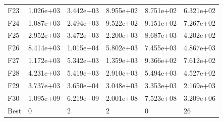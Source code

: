 \begin{tabular}{llllll}
F23  &  1.026e+03 &  3.442e+03 &  8.955e+02 &  8.751e+02 &  6.321e+02 \\
F24  &  1.087e+03 &  2.494e+03 &  9.522e+02 &  9.151e+02 &  7.267e+02 \\
F25  &  2.952e+03 &  3.472e+03 &  2.200e+03 &  8.687e+03 &  4.202e+02 \\
F26  &  8.414e+03 &  1.015e+04 &  5.802e+03 &  7.455e+03 &  4.867e+03 \\
F27  &  1.172e+03 &  5.342e+03 &  1.359e+03 &  9.366e+02 &  7.612e+02 \\
F28  &  4.231e+03 &  5.419e+03 &  2.910e+03 &  5.494e+03 &  4.527e+02 \\
F29  &  3.737e+03 &  3.650e+04 &  3.048e+03 &  3.353e+03 &  2.169e+03 \\
F30  &  1.095e+09 &  6.219e+09 &  2.001e+08 &  7.523e+08 &  3.209e+06 \\
Best &          0 &          2 &          2 &          0 &         26 \\
\bottomrule
\end{tabular}
